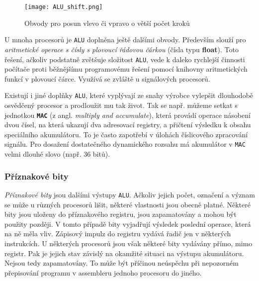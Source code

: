       \begin{figure}[ht!] %
        \centering
        \texttt{[image: ALU\_shift.png]}
        \caption{Obvody pro posun vlevo či vpravo o větší počet kroků}
        \label{MIT:fig_ALUshift}
      \end{figure}    
      
      U mnoha procesorů je \texttt{ALU} doplněna ještě dalšími obvody. Především slouží pro 
      \emph{aritmetické operace  s čísly s plovoucí řádovou čárkou} (čísla typu \textbf{float}). 
      Toto řešení, ačkoliv podstatně zvětšuje složitost \texttt{ALU}, vede k daleko rychlejší 
      činnosti počítače proti běžnějšímu programovému řešení pomocí kni\-hov\-ny aritmetických 
      funkcí v 
      plovoucí čárce. Využívá se zvláště u signálových procesorů.
      
      Existují i jiné doplňky \texttt{ALU}, které vyplývají ze snahy výrobce vylepšit dlouhodobě 
      osvědčený procesor a prodloužit mu tak život. Tak se např. můžeme setkat s jednotkou 
      \textbf{\texttt{MAC}} (z angl. \emph{multiply and accumulate}), která provádí operace 
      násobení dvou čísel, na která ukazují dva adresovací registry, a přičtení výsledku k obsahu 
      speciálního akumulátoru. To je často zapotřebí v úlohách číslicového zpracování signálu. Pro 
      dosažení dostatečného dynamického rozsahu má akumulátor v \texttt{MAC} velmi dlouhé slovo 
      (např. 36 bitů).
      
      \subsubsection{Příznakové bity}
        \emph{Příznakové bity} jsou dalšími výstupy \texttt{ALU}. Ačkoliv jejich počet, označení a 
        význam se může u různých procesorů lišit, některé vlastnosti jsou obecně platné. Některé 
        bity jsou uloženy do příznakového registru, jsou zapamatovány a mohou být použity později. 
        V tomto případě bity vyjadřují výsledek poslední operace, která na ně měla vliv. Zápisový 
        impulz do registru vydává řadič jen v některých instrukcích. U některých procesorů jsou 
        však některé bity vydávány přímo, mimo registr. Pak je jejich stav závislý na okamžité 
        situaci na výstupu akumulátoru. Nejsou tedy zapamatovány. To může být příčinou neúspěchu 
        při nepozorném přepisování programu v assembleru jednoho procesoru do jiného.
        
